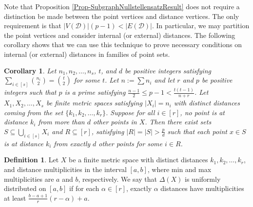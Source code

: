 \documentclass[12pt]{article}
\newtheorem{cor}[thm]{Corollary}
\theoremstyle{definition}
\newtheorem{defn}[thm]{Definition} %
\begin{document}
	Note that Proposition \ref{Prop-SubgraphNullstellensatzResult} does not require a distinction be made between the point vertices and distance vertices.  The only requirement is that $|V(\mathcal{D})|(p-1) < |E(\mathcal{D})|$.  In particular, we may partition the point vertices and consider internal (or external) distances.  The following corollary shows that we can use this technique to prove necessary conditions on internal (or external) distances in families of point sets.
	
	\begin{cor}
		Let $n_1, n_2, \ldots, n_s$, $t$, and $d$ be positive integers satisfying $\sum_{i \in [s]}{n_i \choose 2} = {t \choose 2}$ for some $t$. Let $n := \sum n_i$ and let $r$ and $p$ be positive integers such that $p$ is a prime satisfying $\tfrac{n-1}{2} \leq p-1 < \tfrac{t(t-1)}{n+r}$.  Let $X_1, X_2, \ldots, X_s$ be finite metric spaces satisfying $|X_i| = n_i$ with distinct distances coming from the set $\{k_1, k_2, \ldots, k_r\}$.  Suppose for all $i \in [r]$, no point is at distance $k_i$ from more than $d$ other points in $X$.  Then there exist sets $S \subseteq \bigcup_{i \in [s]}X_i$ and $R \subseteq [r]$, satisfying $|R| = |S| > \tfrac{p}{d}$ such that each point $x \in S$ is at distance $k_i$ from exactly $d$ other points for some $i \in R$.
	\end{cor}
	
	\begin{defn}
		Let $X$ be a finite metric space with distinct distances $k_1, k_2, \ldots, k_r$, and distance multiplicities in the interval $[a,b]$, where min and max multiplicities are $a$ and $b$, respectively.  We say that $\Delta(X)$ is uniformly distributed on $[a,b]$ if for each $\alpha \in [r]$, exactly $\alpha$ distances have multiplicities at least $\tfrac{b-a+1}{r}(r-\alpha) + a$.
	\end{defn}
\end{document}
